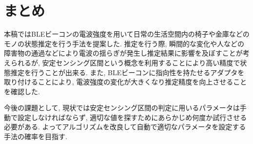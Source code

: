 \documentclass[Japanese]{dicomopapers}
\begin{document}
\section{まとめ}
本稿ではBLEビーコンの電波強度を用いて日常の生活空間内の椅子や金庫などのモノの状態推定を行う手法を提案した.
推定を行う際, 瞬間的な変化や人などの障害物の通過などにより電波の揺らぎが発生し推定結果に影響を及ぼすことが考えられるが, 安定センシング区間という概念を利用することにより高い精度で状態推定を行うことが出来る.
また, BLEビーコンに指向性を持たせるアダプタを取り付けることにより, 電波強度の変化が大きくなり推定精度を向上させることを確認した.

今後の課題として, 現状では安定センシング区間の判定に用いるパラメータは手動で設定しなければならず, 適切な値を探すためにあらかじめ何度か試行させる必要がある.
よってアルゴリズムを改良して自動で適切なパラメータを設定する手法の確率を目指す.


\end{document}
